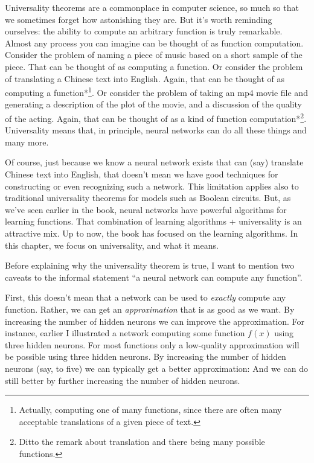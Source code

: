 Universality theorems are a commonplace in computer science, so much so that we sometimes forget how astonishing they are. But it's worth reminding ourselves: the ability to compute an arbitrary function is truly remarkable. Almost any process you can imagine can be thought of as function computation. Consider the problem of naming a piece of music based on a short sample of the piece. That can be thought of as computing a function. Or consider the problem of translating a Chinese text into English. Again, that can be thought of as computing a function*\footnote{Actually, computing one of many functions, since there are often many acceptable translations of a given piece of text.}. Or consider the problem of taking an mp4 movie file and generating a description of the plot of the movie, and a discussion of the quality of the acting. Again, that can be thought of as a kind of function computation*\footnote{Ditto the remark about translation and there being many possible functions.}. Universality means that, in principle, neural networks can do all these things and many more.


Of course, just because we know a neural network exists that can (say) translate Chinese text into English, that doesn't mean we have good techniques for constructing or even recognizing such a network. This limitation applies also to traditional universality theorems for models such as Boolean circuits. But, as we've seen earlier in the book, neural networks have powerful algorithms for learning functions. That combination of learning algorithms + universality is an attractive mix. Up to now, the book has focused on the learning algorithms. In this chapter, we focus on universality, and what it means.





Before explaining why the universality theorem is true, I want to mention two caveats to the informal statement ``a neural network can compute any function''.


First, this doesn't mean that a network can be used to \emph{exactly} compute any function. Rather, we can get an \emph{approximation} that is as good as we want. By increasing the number of hidden neurons we can improve the approximation. For instance, earlier I illustrated a network computing some function $f(x)$ using three hidden neurons. For most functions only a low-quality approximation will be possible using three hidden neurons. By increasing the number of hidden neurons (say, to five) we can typically get a better approximation: And we can do still better by further increasing the number of hidden neurons.


